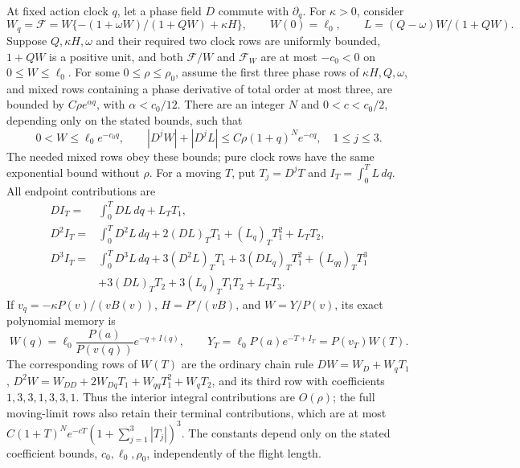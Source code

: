 \begin{lemma}
\label{deg:lem-stable-ratio-ledger}
At fixed action clock \(q\), let a phase field \(D\) commute with
\(\partial_q\). For \(\kappa>0\), consider
\[
 W_q=\mathcal F=W\{- (1+\omega W)/(1+QW)+\kappa H\},
 \qquad W(0)=\ell_0,
 \qquad L=(Q-\omega)W/(1+QW).
\]
Suppose \(Q,\kappa H,\omega\) and their required two clock rows are
uniformly bounded, \(1+QW\) is a positive unit, and both
\(\mathcal F/W\) and \(\mathcal F_W\) are at most \(-c_0<0\)
on \(0\le W\le\ell_0\). For some \(0\le\rho\le\rho_0\),
assume the first three phase rows of \(\kappa H,Q,\omega\),
and mixed rows containing a phase derivative of total order at most three,
are bounded by
\(C\rho e^{\alpha q}\), with \(\alpha<c_0/12\).
There are an integer \(N\) and \(0<c<c_0/2\), depending only on the
stated bounds, such that
\begin{equation}\label{deg:stable-ratio-fixed-clock}
 0<W\le\ell_0e^{-c_0q},\qquad
 |D^jW|+|D^jL|\le C\rho(1+q)^Ne^{-cq},\quad1\le j\le3.
\end{equation}
The needed mixed rows obey these bounds; pure clock rows have the
same exponential bound without \(\rho\).
For a moving \(T\), put \(T_j=D^jT\) and \(I_T=\int_0^T L\,dq\).
All endpoint contributions are
\begin{equation}\label{deg:stable-ratio-terminal-rows}
 \begin{aligned}
 DI_T={}&\int_0^T DL\,dq+L_TT_1,\\
 D^2I_T={}&\int_0^T D^2L\,dq+2(DL)_TT_1+(L_q)_TT_1^2+L_TT_2,\\
 D^3I_T={}&\int_0^T D^3L\,dq+3(D^2L)_TT_1
       +3(DL_q)_TT_1^2+(L_{qq})_TT_1^3\\
 &+3(DL)_TT_2+3(L_q)_TT_1T_2+L_TT_3 .
 \end{aligned}
\end{equation}
If \(v_q=-\kappa P(v)/(vB(v))\), \(H=P'/(vB)\), and
\(W=Y/P(v)\), its exact polynomial memory is
\begin{equation}\label{deg:stable-ratio-polynomial-memory}
 W(q)=\ell_0\frac{P(a)}{P(v(q))}e^{-q+I(q)},\qquad
 Y_T=\ell_0P(a)e^{-T+I_T}=P(v_T)W(T).
\end{equation}
The corresponding rows of \(W(T)\) are the ordinary chain rule
\(DW=W_D+W_qT_1\),
\(D^2W=W_{DD}+2W_{Dq}T_1+W_{qq}T_1^2+W_qT_2\), and its
third row with coefficients \(1,3,3,1,3,3,1\).
Thus the interior integral contributions are \(O(\rho)\); the full
moving-limit rows also retain their terminal contributions, which are at most
\(C(1+T)^Ne^{-cT}(1+\sum_{j=1}^3|T_j|)^3\).
The constants depend only on the stated coefficient bounds,
\(c_0,\ell_0,\rho_0\), independently of the flight length.
\end{lemma}
